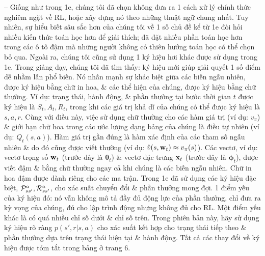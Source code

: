 \documentclass{article}
\begin{document}
\begin{itemize}
    -- Giống như trong 1e, chúng tôi đã chọn không đưa ra 1 cách xử lý chính thức nghiêm ngặt về RL, hoặc xây dựng nó theo những thuật ngữ chung nhất. Tuy nhiên, sự hiểu biết sâu sắc hơn của chúng tôi về 1 số chủ đề kể từ 1e đòi hỏi nhiều kiến thức toán học hơn để giải thích; đã đặt nhiều phần toán học hơn trong các ô tô đậm mà những người không có thiên hướng toán học có thể chọn bỏ qua. Ngoài ra, chúng tôi cũng sử dụng 1 ký hiệu hơi khác được sử dụng trong 1e. Trong giảng dạy, chúng tôi đã tìm thấy: ký hiệu mới giúp giải quyết 1 số điểm dễ nhầm lẫn phổ biến. Nó nhấn mạnh sự khác biệt giữa các biến ngẫu nhiên, được ký hiệu bằng chữ in hoa, \& các thể hiện của chúng, được ký hiệu bằng chữ thường. Ví dụ: trạng thái, hành động, \& phần thưởng tại bước thời gian $t$ được ký hiệu là $S_t,A_t,R_t$, trong khi các giá trị khả dĩ của chúng có thể được ký hiệu là $s,a,r$. Cùng với điều này, việc sử dụng chữ thường cho các hàm giá trị (ví dụ: $v_\pi$) \& giới hạn chữ hoa trong các ước lượng dạng bảng của chúng là điều tự nhiên (ví dụ: $Q_t(s,a)$). Hàm giá trị gần đúng là hàm xác định của các tham số ngẫu nhiên \& do đó cũng được viết thường (ví dụ: $\hat{v}(s,{\bf w}_t)\approx v_\pi(s)$). Các vectơ, ví dụ: vectơ trọng số ${\bf w}_t$ (trước đây là $\boldsymbol{\theta}_t$) \& vectơ đặc trưng ${\bf x}_t$ (trước đây là $\boldsymbol{\phi}_t$), được viết đậm \& bằng chữ thường ngay cả khi chúng là các biến ngẫu nhiên. Chữ in hoa đậm được dành riêng cho các ma trận. Trong 1e đã sử dụng các ký hiệu đặc biệt, ${\cal P}_{ss'}^a,{\cal R}_{ss'}^a$, cho xác suất chuyển đổi \& phần thưởng mong đợi. 1 điểm yếu của ký hiệu đó: nó vẫn không mô tả đầy đủ động lực của phần thưởng, chỉ đưa ra kỳ vọng của chúng, đủ cho lập trình động nhưng không đủ cho RL. Một điểm yếu khác là có quá nhiều chỉ số dưới \& chỉ số trên. Trong phiên bản này, hãy sử dụng ký hiệu rõ ràng $p(s',r|s,a)$ cho xác suất kết hợp cho trạng thái tiếp theo \& phần thưởng dựa trên trạng thái hiện tại \& hành động. Tất cả các thay đổi về ký hiệu được tóm tắt trong bảng ở trang 6.


\end{itemize}
\end{document}
